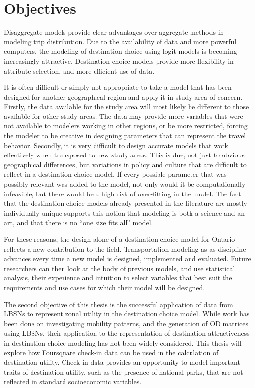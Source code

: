 \section{Objectives}
Disaggregate models provide clear advantages over aggregate methods in modeling trip distribution. Due to the availability of data and more powerful computers, the modeling of destination choice using logit models is becoming increasingly attractive. Destination choice models provide more flexibility in attribute selection, and more efficient use of data. 

It is often difficult or simply not appropriate to take a model that has been designed for another geographical region and apply it in study area of concern. Firstly, the data available for the study area will most likely be different to those available for other study areas. The data may provide more variables that were not available to modelers working in other regions, or be more restricted, forcing the modeler to be creative in designing parameters that can represent the travel behavior. Secondly, it is very difficult to design accurate models that work effectively when transposed to new study areas. This is due, not just to obvious geographical differences, but variations in policy and culture that are difficult to reflect in a destination choice model. If every possible parameter  that was possibly relevant was added to the model, not only would it be computationally infeasible, but there would be a high risk of over-fitting in the model. The fact that the destination choice models already presented in the literature are mostly individually unique supports this notion that modeling is both a science and an art, and that there is no \enquote{one size fits all} model.

For these reasons, the design alone of a destination choice model for Ontario reflects a new contribution to the field.  Transportation modeling as as discipline advances every time a new model is designed, implemented and evaluated. Future researchers can then look at the body of previous models, and use statistical analysis, their experience and intuition to select variables that best suit the requirements and use cases for which their model will be designed. 

The second objective of this thesis is the successful application of data from LBSNs to represent zonal utility in the destination choice model. While work has been done on investigating mobility patterns, and the generation of OD matrices using LBSNs, their application to the representation of destination attractiveness in destination choice modeling has not been widely considered. This thesis will explore how Foursquare check-in data can be used in the calculation of destination utility. Check-in data provides an opportunity to model important traits of destination utility, such as the presence of national parks, that are not reflected in standard socioeconomic variables.

